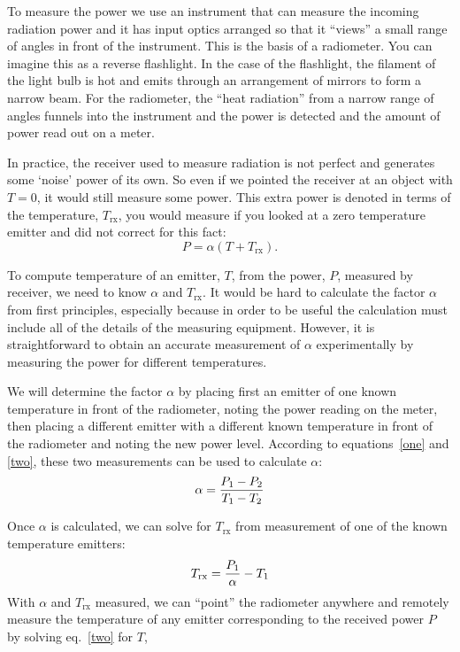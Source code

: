 To measure the power we use an instrument that can measure the incoming radiation power and it has input optics arranged so that it ``views'' a small range of angles in front of the instrument. This is the basis of a radiometer. You can imagine this as a reverse flashlight. In the case of the flashlight, the filament of the light bulb is hot and emits through an arrangement of mirrors to form a narrow beam. For the radiometer, the ``heat radiation'' from a narrow range of angles funnels into the instrument and the power is detected and the amount of power read out on a meter.

In practice, the receiver used to measure radiation is not perfect and generates some `noise' power of its own. So even if we pointed the receiver at an object with $T=0$, it would still measure some power. This extra power is denoted in terms of the temperature, $T_\textrm{rx}$, you would measure if you looked at a zero temperature emitter and did not correct for this fact:
\begin{equation}
P = \alpha (T + T_\textrm{rx}).
\label{two}
\end{equation}

To compute temperature of an emitter, $T$, from the power, $P$, measured by receiver, we need to know $\alpha$ and $T_\textrm{rx}$. 
It would be hard to calculate the factor $\alpha$ from first principles, especially because in order to be useful the calculation must include all of the details of the measuring equipment.  However, it is straightforward to obtain an accurate measurement of  $\alpha$ experimentally by measuring the power for different temperatures.

We will determine the factor $\alpha$ by placing first an emitter of one known temperature in front of the radiometer, noting the power reading on the meter, then placing a different emitter with a different known temperature in front of the radiometer and noting the new power level. According to equations~\ref{one} and \ref{two}, these two measurements can be used to calculate $\alpha$:
\begin{equation}
\alpha = {P_1 - P_2 \over T_1 - T_2}
\label{three}
\end{equation}

Once $\alpha$ is calculated, we can solve for $T_\textrm{rx}$ from measurement of one of the known temperature emitters:
\begin{equation}
T_\textrm{rx} = {P_1 \over \alpha} -T_1
\label{four}
\end{equation}
With $\alpha$ and $T_\textrm{rx}$ measured, we can ``point'' the radiometer anywhere and remotely measure the temperature of any emitter corresponding to the received power $P$ by solving eq.~\ref{two}  for $T$,

